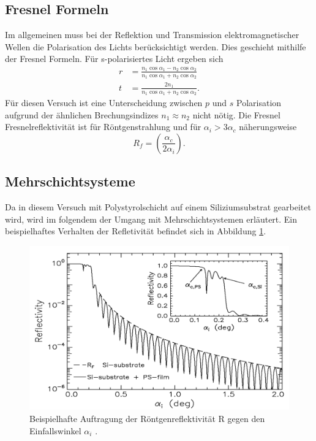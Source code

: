 \subsection{Fresnel Formeln}
Im allgemeinen muss bei der Reflektion und Transmission elektromagnetischer Wellen die Polarisation des Lichts berücksichtigt werden. Dies geschieht mithilfe der Fresnel Formeln. Für s-polarisiertes Licht ergeben sich
\begin{align}
    r &= \frac{n_1 \cos{\alpha_1} - n_2 \cos{\alpha_2} }{n_1 \cos{\alpha_1} + n_2 \cos{\alpha_2} }\\
    t &= \frac{2 n_1 }{n_1 \cos{\alpha_1} + n_2 \cos{\alpha_2} }.
\end{align}
Für diesen Versuch ist eine Unterscheidung zwischen $p$ und $s$ Polarisation aufgrund der ähnlichen Brechungsindizes $n_1 \approx n_2$ nicht nötig. 
Die Fresnel Fresnelreflektivität ist für Röntgenstrahlung und für $ \alpha_i > 3\alpha_c$ näherungsweise
\begin{equation}
  R_f = \left( \frac{\alpha_c}{2 \alpha_i} \right)  . 
\end{equation}

\subsection{Mehrschichtsysteme}
Da in diesem Versuch mit Polystyrolschicht auf einem Siliziumsubstrat gearbeitet wird, wird im folgendem
der Umgang mit Mehrschichtsystemen erläutert. Ein beispielhaftes Verhalten der Refletivität befindet sich in Abbildung \ref{fig:reflectivity}. 

\begin{figure}[H]
    \centering
    \includegraphics[width = 0.8 \textwidth]{content/images/reflectivity.png}
    \caption{Beispielhafte Auftragung der Röntgenreflektivität R gegen den Einfallswinkel $\alpha_i$ \cite{e1}. }
    \label{fig:reflectivity}
\end{figure}

